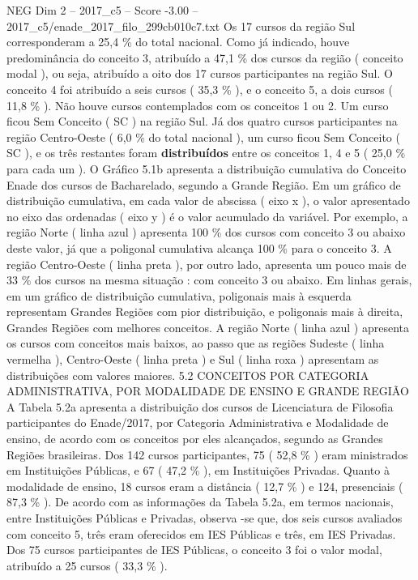 \begin{textsample}{NEG Dim 2 – 2017\_c5 – Score -3.00 – 2017\_c5/enade\_2017\_filo\_299cb010c7.txt}
Os 17 cursos da região Sul corresponderam a 25,4 \% do total nacional.
Como já indicado, houve predominância do conceito 3, atribuído a 47,1 \% dos cursos da região ( conceito modal ), ou seja, atribuído a oito dos 17 cursos participantes na região Sul.
O conceito 4 foi atribuído a seis cursos ( 35,3 \% ), e o conceito 5, a dois cursos ( 11,8 \% ).
Não houve cursos contemplados com os conceitos 1 ou 2.
Um curso ficou Sem Conceito ( SC ) na região Sul.
Já dos quatro cursos participantes na região Centro-Oeste ( 6,0 \% do total nacional ), um curso ficou Sem Conceito ( SC ), e os três restantes foram \textbf{distribuídos} entre os conceitos 1, 4 e 5 ( 25,0 \% para cada um ).
O Gráfico 5.1b apresenta a distribuição cumulativa do Conceito Enade dos cursos de Bacharelado, segundo a Grande Região.
Em um gráfico de distribuição cumulativa, em cada valor de abscissa ( eixo x ), o valor apresentado no eixo das ordenadas ( eixo y ) é o valor acumulado da variável.
Por exemplo, a região Norte ( linha azul ) apresenta 100 \% dos cursos com conceito 3 ou abaixo deste valor, já que a poligonal cumulativa alcança 100 \% para o conceito 3.
A região Centro-Oeste ( linha preta ), por outro lado, apresenta um pouco mais de 33 \% dos cursos na mesma situação : com conceito 3 ou abaixo.
Em linhas gerais, em um gráfico de distribuição cumulativa, poligonais mais à esquerda representam Grandes Regiões com pior distribuição, e poligonais mais à direita, Grandes Regiões com melhores conceitos.
A região Norte ( linha azul ) apresenta os cursos com conceitos mais baixos, ao passo que as regiões Sudeste ( linha vermelha ), Centro-Oeste ( linha preta ) e Sul ( linha roxa ) apresentam as distribuições com valores maiores. 5.2 CONCEITOS POR CATEGORIA ADMINISTRATIVA, POR MODALIDADE DE ENSINO E GRANDE REGIÃO A Tabela 5.2a apresenta a distribuição dos cursos de Licenciatura de Filosofia participantes do Enade/2017, por Categoria Administrativa e Modalidade de ensino, de acordo com os conceitos por eles alcançados, segundo as Grandes Regiões brasileiras.
Dos 142 cursos participantes, 75 ( 52,8 \% ) eram ministrados em Instituições Públicas, e 67 ( 47,2 \% ), em Instituições Privadas.
Quanto à modalidade de ensino, 18 cursos eram a distância ( 12,7 \% ) e 124, presenciais ( 87,3 \% ).
De acordo com as informações da Tabela 5.2a, em termos nacionais, entre Instituições Públicas e Privadas, observa -se que, dos seis cursos avaliados com conceito 5, três eram oferecidos em IES Públicas e três, em IES Privadas.
Dos 75 cursos participantes de IES Públicas, o conceito 3 foi o valor modal, atribuído a 25 cursos ( 33,3 \% ).

\end{textsample}
